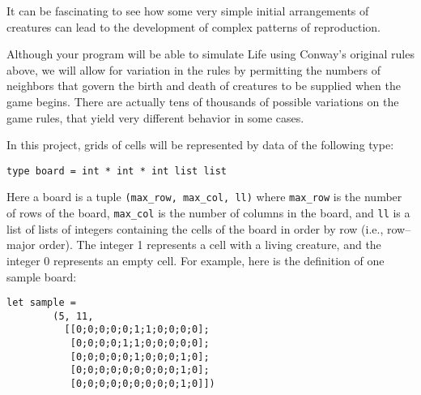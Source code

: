 \documentclass[11pt]{article}
\begin{document}
    \vspace{-2.5mm}

    It can be fascinating to see how some very simple initial arrangements
  of creatures can lead to the development of complex patterns of
  reproduction.

    Although your program will be able to simulate Life using Conway's
  original rules above, we will allow for variation in the rules by
  permitting the numbers of neighbors that govern the birth and death of
  creatures to be supplied when the game begins.  There are actually tens of
  thousands of possible variations on the game rules, that yield very
  different behavior in some cases.

    In this project, grids of cells will be represented by data of the
  following type:

    \vspace{-2mm}

    \begin{center}

      \texttt{type board = int * int * int list list}

    \end{center}

    \vspace{-2mm}

    Here a board is a tuple \texttt{(max\_row, max\_col, ll)} where
  \texttt{max\_row} is the number of rows of the board, \texttt{max\_col} is
  the number of columns in the board, and \texttt{ll} is a list of lists of
  integers containing the cells of the board in order by row (i.e.,
  row--major order).  The integer 1 represents a cell with a living
  creature, and the integer 0 represents an empty cell.  For example, here
  is the definition of one sample board:

    \vspace{-1mm}

    \begin{center}

      \begin{BVerbatim}[gobble=6]
      let sample =
        (5, 11,
          [[0;0;0;0;0;1;1;0;0;0;0];
           [0;0;0;0;1;1;0;0;0;0;0];
           [0;0;0;0;0;1;0;0;0;1;0];
           [0;0;0;0;0;0;0;0;0;1;0];
           [0;0;0;0;0;0;0;0;0;1;0]])
      \end{BVerbatim}

    \end{center}

    \vspace{-1mm}
\end{document}
